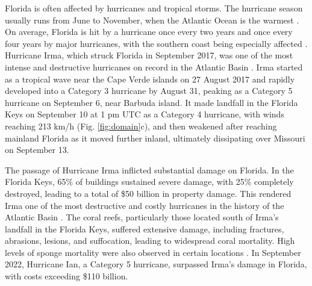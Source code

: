 \documentclass[fleqn,10pt]{wlscirep}
\begin{document}
Florida is often affected by hurricanes and tropical storms. The hurricane season usually runs from June to November, when the Atlantic Ocean is the warmest \citep{Neumann1999}. On average, Florida is hit by a hurricane once every two years and once every four years by major hurricanes, with the southern coast being especially affected \citep{Malmstadt2009Jan,IFAS2021Aug}. Hurricane Irma, which struck Florida in September 2017, was one of the most intense and destructive hurricanes on record in the Atlantic Basin \citep{Cangialosi2018,Xian2018Jul}. Irma started as a tropical wave near the Cape Verde islands on 27 August 2017 and rapidly developed into a Category 3 hurricane by August 31, peaking as a Category 5 hurricane on September 6, near Barbuda island. It made landfall in the Florida Keys on September 10 at 1 pm UTC as a Category 4 hurricane, with winds reaching 213 km/h (Fig. \ref{fig:domain}c), and then weakened after reaching mainland Florida as it moved further inland, ultimately dissipating over Missouri on September 13.

The passage of Hurricane Irma inflicted substantial damage on Florida. In the Florida Keys, 65\% of buildings sustained severe damage, with 25\% completely destroyed, leading to a total of \$50 billion in property damage. This rendered Irma one of the most destructive and costly hurricanes in the history of the Atlantic Basin \citep{Cangialosi2018,NOAAcost}. The coral reefs, particularly those located south of Irma's landfall in the Florida Keys, suffered extensive damage, including fractures, abrasions, lesions, and suffocation, leading to widespread coral mortality. High levels of sponge mortality were also observed in certain locations \citep{NOAAirma2022Aug}. In September 2022, Hurricane Ian, a Category 5 hurricane, surpassed Irma's damage in Florida, with costs exceeding \$110 billion.
\end{document}
